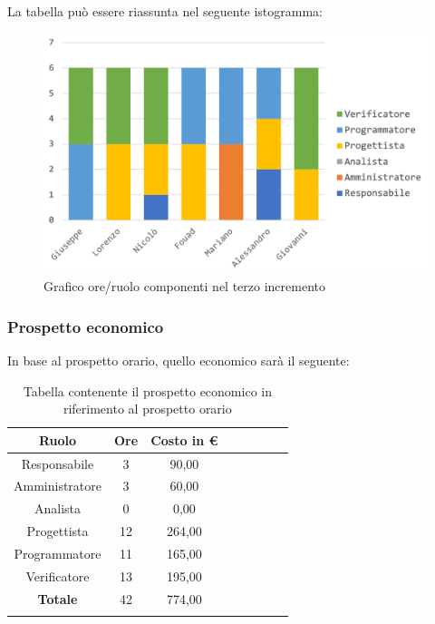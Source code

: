 		La tabella può essere riassunta nel seguente istogramma:
		\begin{figure}[H]
			\centering
			\includegraphics[width=0.8\linewidth]{./images/preventivo/incremento3-1.png}
			\caption{Grafico ore/ruolo componenti nel terzo incremento}
			\label{fig:grafico suddivione ruoli incremento III}
		\end{figure}
		
		\subsubsection{Prospetto economico}
		In base al prospetto orario, quello economico sarà il seguente: 
		
		\begin{longtable}{|c|c|c|c|c|c|c|c|}
			\hline
			\rowcolor{lighter-grayer}
			\textbf{Ruolo} & \textbf{Ore} & \textbf{Costo in € } \\
			\hline
			\endfirsthead
			
			\hline
			Responsabile 	    & 3 & 90,00\\
			\hline 
			\hline
			Amministratore	   & 3 & 60,00\\
			\hline
			\hline
			Analista 				& 0 & 0,00\\
			\hline
			\hline
			Progettista 		   & 12 & 264,00\\
			\hline
			\hline
			Programmatore 	  & 11 & 165,00\\
			\hline
			\hline
			Verificatore 		   & 13 & 195,00\\
			\hline
			\textbf{Totale} 	 & 42 & 774,00\\
			\hline
			\caption{Tabella contenente il prospetto economico in riferimento al prospetto orario}
		\end{longtable}
		\pagebreak
		
